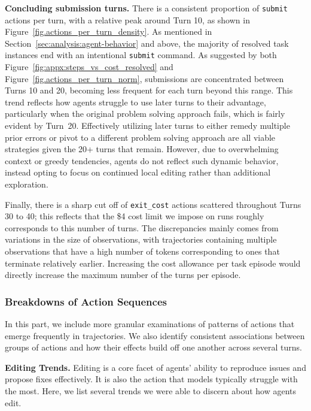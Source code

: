 \textbf{Concluding submission turns.} 
There is a consistent proportion of \texttt{submit} actions per turn, with a relative peak around Turn \num{10}, as shown in Figure~\ref{fig.actions_per_turn_density}.
As mentioned in Section~\ref{sec:analysis:agent-behavior} and above, the majority of resolved task instances end with an intentional \texttt{submit} command.
As suggested by both Figure~\ref{fig:appx:steps_vs_cost_resolved} and Figure~\ref{fig.actions_per_turn_norm}, submissions are concentrated between Turns \num{10} and \num{20}, becoming less frequent for each turn beyond this range.
This trend reflects how agents struggle to use later turns to their advantage, particularly when the original problem solving approach fails, which is fairly evident by Turn~\num{20}.
Effectively utilizing later turns to either remedy multiple prior errors or pivot to a different problem solving approach are all viable strategies given the \num{20}+ turns that remain.
However, due to overwhelming context or greedy tendencies, agents do not reflect such dynamic behavior, instead opting to focus on continued local editing rather than additional exploration.

Finally, there is a sharp cut off of \texttt{exit\_cost} actions scattered throughout Turns \num{30} to \num{40}; this reflects that the \$\num{4} cost limit we impose on runs roughly corresponds to this number of turns.
The discrepancies mainly comes from variations in the size of observations, with trajectories containing multiple observations that have a high number of tokens corresponding to ones that terminate relatively earlier.
Increasing the cost allowance per task episode would directly increase the maximum number of the turns per episode.

\subsubsection{Breakdowns of Action Sequences}
\label{appx:analyses:trajectory_analysis:action_breakdown}
In this part, we include more granular examinations of patterns of actions that emerge frequently in trajectories.
We also identify consistent associations between groups of actions and how their effects build off one another across several turns.

\textbf{Editing Trends.}
Editing is a core facet of agents' ability to reproduce issues and propose fixes effectively. 
It is also the action that models typically struggle with the most.
Here, we list several trends we were able to discern about how agents edit.

